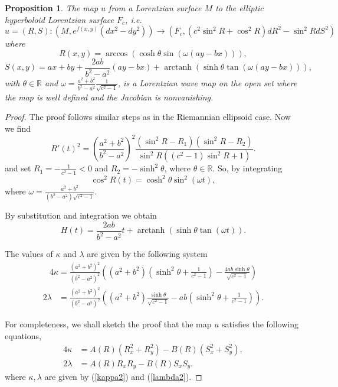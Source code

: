 \documentclass[12pt]{amsart}
\DeclareMathOperator\arctanh{arctanh}
\newtheorem{proposition}[theorem]{Proposition}
\newcommand{\sh}{\sinh}
\begin{document}
\begin{proposition}\label{prop:hyperboloid}
The map $u$ from a Lorentzian surface $M$ to the elliptic hyperboloid Lorentzian surface $F_c$, i.e.
		\[
		u= (R,S): (M,e^{f(x,y)}(dx^2 - dy^2)) \rightarrow
		(F_c, (c^2\sin^2R + \cos^2R)dR^2 - \sin^2RdS^2)
		\]
		where 
		\[
		R(x,y) = \arccos 
		\left(
		\cosh\theta
		\sin
		\left(   
		\omega
		(ay - bx)
		\right)
		\right),
		\]
		\[
		S(x,y) = ax + by + \frac{2ab}{b^2 - a^2}(ay - bx)
		+ \arctanh
		\left(
		\sinh\theta 
		\tan
		\left(
		\omega(ay - bx)
		\right)
		\right),
		\]
		with $\theta \in \mathbb{R}$ and 
		$\omega = \frac{a^2 + b^2}{b^2 - a^2}
		\frac{1}{\sqrt{c^2 - 1}}$, is a Lorentzian wave map on the open set where the map is well defined and the Jacobian is nonvanishing.
	\end{proposition}
	\begin{proof}
	The proof follows similar steps as in the Riemannian ellipsoid case. Now we find
	\[
		R'(t)^2 = 
		\left(
		\frac{a^2 + b^2}{b^2 - a^2}
		\right)^2
		\frac{(\sin^2R - R_1)(\sin^2R - R_2)}
		{\sin^2R\left((c^2 - 1)\sin^2R + 1\right)}.
		\]
		and set $R_1 = - \frac{1}{c^2 - 1} < 0$ and
		$R_2 = - \sh^2\theta$, where $\theta \in \mathbb{R}$. So, by integrating
		\[
		\cos^2R(t) = \cosh^2\theta 
		\sin^2(\omega t),
		\]
		where $\omega  = \frac{a^2 + b^2}{(b^2 - a^2)\sqrt{c^2 - 1}}$.
		
		By substitution and integration we obtain
		\[
		H(t) =  \frac{2ab}{b^2 - a^2}t + 
		\arctanh
		\left(
		\sh\theta \tan(\omega t)
		\right).
		\]
	
	
	The values of $\kappa$ and $\lambda$ are given by the following system
	\begin{align}\label{kappa2}
			4\kappa  = \frac{(a^2 + b^2)^2}{(b^2 - a^2)^2}
			\left(
			(a^2 + b^2)
			\left(\sh^2\theta + \frac{1}{c^2 - 1}\right) - 
			\frac{4ab\sh\theta}{\sqrt{c^2 - 1}}
			\right)
		\end{align}
		\begin{align}\label{lambda2}
			2\lambda & = \frac{(a^2 + b^2)^2}{(b^2 - a^2)^2}
			\left(
			(a^2 + b^2)\frac{\sh\theta}{\sqrt{c^2 - 1}} - 
			ab\left(\sh^2\theta + \frac{1}{c^2 - 1}\right)
			\right) .
		\end{align}
		
	
	
	For completeness, we shall sketch the proof that the map $u$ satisfies the following equations,
		\begin{align*}
			4\kappa &= A(R)(R_x^2 + R_y^2) - B(R)(S_x^2 + S_y^2), \\
			2\lambda & = A(R)R_xR_y - B(R)S_xS_y.
		\end{align*}
		where $\kappa, \lambda$ are given by (\ref{kappa2}) and (\ref{lambda2}).
		

\end{proof}
\end{document}
